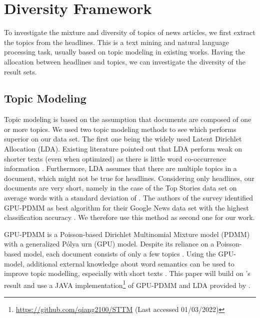 \section{Diversity Framework} %
\label{sec:methodology}

To investigate the mixture and diversity of topics of news articles, we first extract the topics from the headlines. This is a text mining and natural language processing task, usually based on topic modeling in existing works. 
Having the allocation between headlines and topics, we can investigate the diversity of the result sets.

\subsection{Topic Modeling}

Topic modeling is based on the assumption that documents are composed of one or more topics. We used two topic modeling methods to see which performs superior on our data set. The first one being 
the widely used Latent Dirichlet Allocation (LDA). Existing literature pointed out that LDA perform weak on shorter texts (even when optimized) as there is little word co-occurrence information \citep{lin_dual-sparse_2014, qiang_short_2020, li_enhancing_2017}. Furthermore, LDA assumes that there are multiple topics in a document, which might not be true for headlines. 
Considering only headlines, our documents are very short, namely in the case of the Top Stories data set on average  words with a standard deviation of . 
The authors of the survey \citet{qiang_short_2020} 
identified GPU-PDMM as best algorithm for their Google News data set with the highest classification accuracy \citep{qiang_short_2020}. We therefore use this method as second one for our work. 

GPU-PDMM is a Poisson-based Dirichlet Multinomial Mixture model (PDMM) 
with a generalized Pólya urn (GPU) model. 
Despite its reliance on a Poisson-based model, each document consists of only a few topics \citep{qiang_short_2020}.  Using the GPU-model, additional external knowledge about word semantics can be used to improve topic modelling, especially with short texts \citep{li_enhancing_2017}. This paper will build on \citet{qiang_short_2020}'s result and use a JAVA implementation\footnote{\href{https://github.com/qiang2100/STTM}{https://github.com/qiang2100/STTM} (Last accessed 01/03/2022)} of GPU-PDMM and LDA provided by \citet{qiang_short_2020}.


